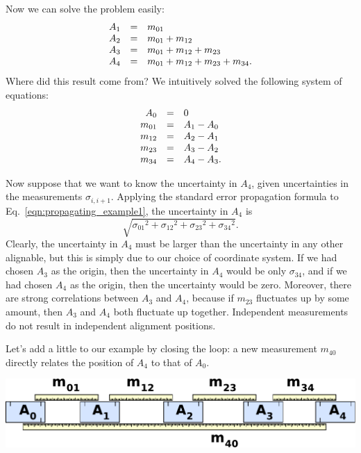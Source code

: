 \documentclass[12pt]{article}
\begin{document}
Now we can solve the problem easily:
\begin{equation}
\begin{array}{r c l}
A_1 & = & m_{01} \\
A_2 & = & m_{01} + m_{12} \\
A_3 & = & m_{01} + m_{12} + m_{23} \\
A_4 & = & m_{01} + m_{12} + m_{23} + m_{34}.
\end{array}
\label{eqn:propagating_example1}
\end{equation}
Where did this result come from?  We intuitively solved the following
system of equations:
\begin{equation}
\begin{array}{r c l}
A_0 &=& 0 \\
m_{01} &=& A_1 - A_0 \\
m_{12} &=& A_2 - A_1 \\
m_{23} &=& A_3 - A_2 \\
m_{34} &=& A_4 - A_3.
\end{array}
\label{eqn:propagating_example2}
\end{equation}

Now suppose that we want to know the uncertainty in $A_4$, given
uncertainties in the measurements $\sigma_{i,i+1}$.  Applying the
standard error propagation formula to
Eq.~\ref{eqn:propagating_example1}, the uncertainty in $A_4$ is
\begin{equation}
\sqrt{{\sigma_{01}}^2 + {\sigma_{12}}^2 + {\sigma_{23}}^2 + {\sigma_{34}}^2}.
\end{equation}
Clearly, the uncertainty in $A_4$ must be larger than the uncertainty
in any other alignable, but this is simply due to our choice of
coordinate system.  If we had chosen $A_3$ as the origin, then the
uncertainty in $A_4$ would be only $\sigma_{34}$, and if we had chosen
$A_4$ as the origin, then the uncertainty would be zero.  Moreover,
there are strong correlations between $A_3$ and $A_4$, because if
$m_{23}$ fluctuates up by some amount, then $A_3$ and $A_4$ both
fluctuate up together.  Independent measurements do not result in
independent alignment positions.

\vspace{0.2 cm}
\noindent \begin{minipage}{\linewidth}
\hspace{0.4 cm} Let's add a little to our example by closing the loop: a new
measurement $m_{40}$ directly relates the position of $A_4$ to that of
$A_0$.
\begin{center}
\includegraphics[width=0.8\linewidth]{PLOTS/propagating_example3.pdf}
\end{center}
\end{minipage}
\end{document}

